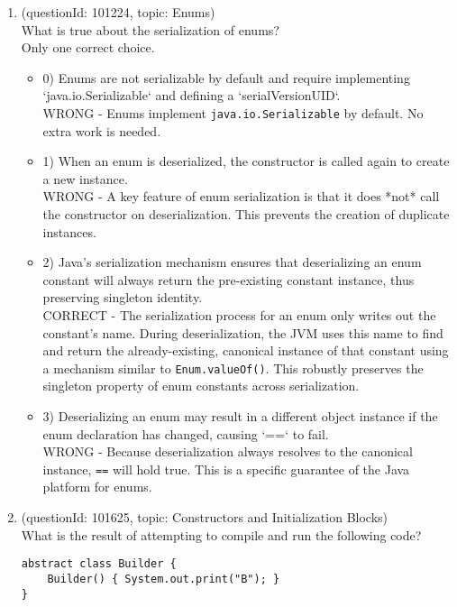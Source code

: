 \documentclass[12pt]{article}
\begin{document}
\begin{enumerate}[label=(\arabic*)]
\begin{itemize}
\end{itemize}
\item (questionId: 101224, topic: Enums) \\ 
What is true about the serialization of enums?
\\ \noindent Only one correct choice. 
\begin{itemize}
\item 0) Enums are not serializable by default and require implementing `java.io.Serializable` and defining a `serialVersionUID`.
 \\ 
WRONG - Enums implement \verb|java.io.Serializable| by default. No extra work is needed.

\item 1) When an enum is deserialized, the constructor is called again to create a new instance.
 \\ 
WRONG - A key feature of enum serialization is that it does *not* call the constructor on deserialization. This prevents the creation of duplicate instances.

\item 2) Java's serialization mechanism ensures that deserializing an enum constant will always return the pre-existing constant instance, thus preserving singleton identity.
 \\ 
CORRECT - The serialization process for an enum only writes out the constant's name. During deserialization, the JVM uses this name to find and return the already-existing, canonical instance of that constant using a mechanism similar to \verb|Enum.valueOf()|. This robustly preserves the singleton property of enum constants across serialization.

\item 3) Deserializing an enum may result in a different object instance if the enum declaration has changed, causing `==` to fail.
 \\ 
WRONG - Because deserialization always resolves to the canonical instance, \verb|==| will hold true. This is a specific guarantee of the Java platform for enums.

\end{itemize}
\item (questionId: 101625, topic: Constructors and Initialization Blocks) \\ 
What is the result of attempting to compile and run the following code?\n\begin{verbatim}
abstract class Builder {
    Builder() { System.out.print("B"); }
}


\end{verbatim}
\end{enumerate}
\end{document}
